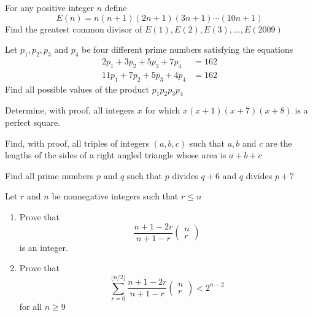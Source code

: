 \documentclass{pset}
\begin{document}
\begin{problems}
\begin{problem}[IrMO 2009 Q7]
    For any positive integer \(n\) define
    $$
    E(n)=n(n+1)(2 n+1)(3 n+1) \cdots(10 n+1)
    $$
    Find the greatest common divisor of \(E(1), E(2), E(3), \ldots, E(2009)\)
\end{problem}

\begin{problem}[IrMO 2008 Q1]
    Let \(p_{1}, p_{2}, p_{3}\) and \(p_{4}\) be four different prime numbers satisfying the equations
$$
\begin{aligned}
2 p_{1}+3 p_{2}+5 p_{3}+7 p_{4} &=162 \\
11 p_{1}+7 p_{2}+5 p_{3}+4 p_{4} &=162
\end{aligned}
$$
Find all possible values of the product \(p_{1} p_{2} p_{3} p_{4}\)
\end{problem}

\begin{problem}[IrMO 2008 Q3]
    Determine, with proof, all integers \(x\) for which \(x(x+1)(x+7)(x+8)\) is a perfect square.
\end{problem}

\begin{problem}[IrMO 2008 Q6]
    Find, with proof, all triples of integers \((a, b, c)\) such that \(a, b\) and \(c\) are the lengths of the sides of a right angled triangle whose area is \(a+b+c\)
\end{problem}

\begin{problem}[IrMO 2007 Q1]
    Find all prime numbers \(p\) and \(q\) such that \(p\) divides \(q+6\) and \(q\) divides \(p+7\)
\end{problem}

\begin{problem}[IrMO 2007 Q5]
    Let \(r\) and \(n\) be nonnegative integers such that \(r \leq n\)
    \begin{enumerate}
    \item Prove that
    $$
    \frac{n+1-2 r}{n+1-r}\left(\begin{array}{l}
    {n} \\
    {r}
    \end{array}\right)
    $$
    is an integer.
    \item Prove that
    $$
    \sum_{r=0}^{\lfloor n / 2\rfloor} \frac{n+1-2 r}{n+1-r}\left(\begin{array}{l}
    {n} \\
    {r}
    \end{array}\right)<2^{n-2}
    $$
    for all \(n \geq 9\)
\end{enumerate}
\end{problem}


\end{problems}
\end{document}
